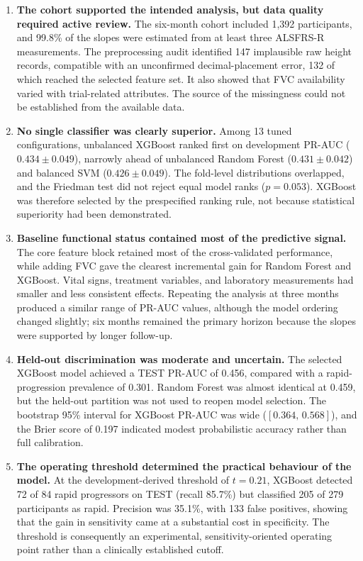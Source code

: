 \begin{enumerate}
  \item \textbf{The cohort supported the intended analysis, but data quality required active review.}
    The six-month cohort included 1,392 participants, and 99.8\% of the slopes were estimated from at least three \gls{ALSFRS-R} measurements.
    The preprocessing audit identified 147 implausible raw height records, compatible with an unconfirmed decimal-placement error, 132 of which reached the selected feature set. It also showed that \gls{FVC} availability varied with trial-related attributes.
    The source of the missingness could not be established from the available data.

  \item \textbf{No single classifier was clearly superior.}
    Among 13 tuned configurations, unbalanced XGBoost ranked first on development \gls{PR-AUC} ($0.434 \pm 0.049$), narrowly ahead of unbalanced Random Forest ($0.431 \pm 0.042$) and balanced \gls{SVM} ($0.426 \pm 0.049$).
    The fold-level distributions overlapped, and the Friedman test did not reject equal model ranks ($p=0.053$).
    XGBoost was therefore selected by the prespecified ranking rule, not because statistical superiority had been demonstrated.

  \item \textbf{Baseline functional status contained most of the predictive signal.}
    The core feature block retained most of the cross-validated performance, while adding \gls{FVC} gave the clearest incremental gain for Random Forest and XGBoost.
    Vital signs, treatment variables, and laboratory measurements had smaller and less consistent effects.
    Repeating the analysis at three months produced a similar range of \gls{PR-AUC} values, although the model ordering changed slightly; six months remained the primary horizon because the slopes were supported by longer follow-up.

  \item \textbf{Held-out discrimination was moderate and uncertain.}
    The selected XGBoost model achieved a TEST \gls{PR-AUC} of 0.456, compared with a rapid-progression prevalence of 0.301.
    Random Forest was almost identical at 0.459, but the held-out partition was not used to reopen model selection.
    The bootstrap 95\% interval for XGBoost \gls{PR-AUC} was wide ($[0.364,\,0.568]$), and the Brier score of 0.197 indicated modest probabilistic accuracy rather than full calibration.

  \item \textbf{The operating threshold determined the practical behaviour of the model.}
    At the development-derived threshold of $t=0.21$, XGBoost detected 72 of 84 rapid progressors on TEST (recall 85.7\%) but classified 205 of 279 participants as rapid.
    Precision was 35.1\%, with 133 false positives, showing that the gain in sensitivity came at a substantial cost in specificity.
    The threshold is consequently an experimental, sensitivity-oriented operating point rather than a clinically established cutoff.


\end{enumerate}
